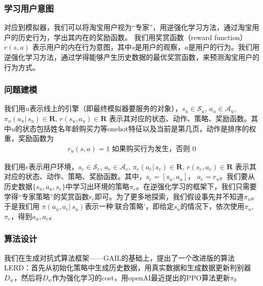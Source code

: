 \subsubsection{学习用户意图}
对应到模拟器，我们可以将淘宝用户视为“专家”，用逆强化学习方法，通过淘宝用户的历史行为，学出其内在的奖励函数。
我们用奖赏函数（reward function） $r(s,a)$ 表示用户的内在行为意图，其中$s$是用户的观察，$a$是用户的行为。我们用逆强化学习方法，通过学得能够产生历史数据的最优奖赏函数，来预测淘宝用户的行为方式。

\subsubsection{问题建模}
我们用${u}$表示线上的引擎（即最终模拟器要服务的对象），$s_u \in \mathcal{S}_u$, $a_u \in \mathcal{A}_u$, $\pi_u(a_u|\,s_u)\in\mathbf{R}$, $r(s_u,a_u)\in\mathbf{R}$ 表示其对应的状态、动作、策略、奖励函数。其中${u}$的状态包括姓名年龄购买力等onehot特征以及当前是第几页，动作是排序的权重，奖励函数为
\begin{align}
r_u(s,a) = 1 \text{ 如果购买行为发生，否则 } 0
\end{align}

我们用${e}$表示用户环境，$s_e \in \mathcal{S}_e$, $a_e \in \mathcal{A}_e$, $\pi_e(a_e|\,s_e)\in\mathbf{R}$, $r(s_e,a_e)\in\mathbf{R}$ 表示其对应的状态、动作、策略、奖励函数。其中，$s_e = [s_u, a_u]$， $a_e = r_u$。我们要从历史数据$\{s_u,a_u,s_e\}$中学习出环境的策略$\pi_e$。在逆强化学习的框架下，我们只需要学得“专家策略”的奖赏函数$r_e$即可。为了更多地探索，我们假设事先并不知道$\pi_u$。于是我们用 $\pi(a_u,a_e|\,s_u)$表示一种‘联合策略’，即给定$s_u$的情况下，依次使用$\pi_u$, $\pi_e$，得到$a_u,a_e$。

\subsubsection{算法设计}


我们在生成对抗式算法框架——GAIL的基础上，提出了一个改进版的算法LERD：首先从初始化策略中生成历史数据，用真实数据和生成数据更新判别器$D_w$，然后将$D_w$作为强化学习的cost，用openAI最近提出的PPO算法更新$\pi_{\theta}$



 
